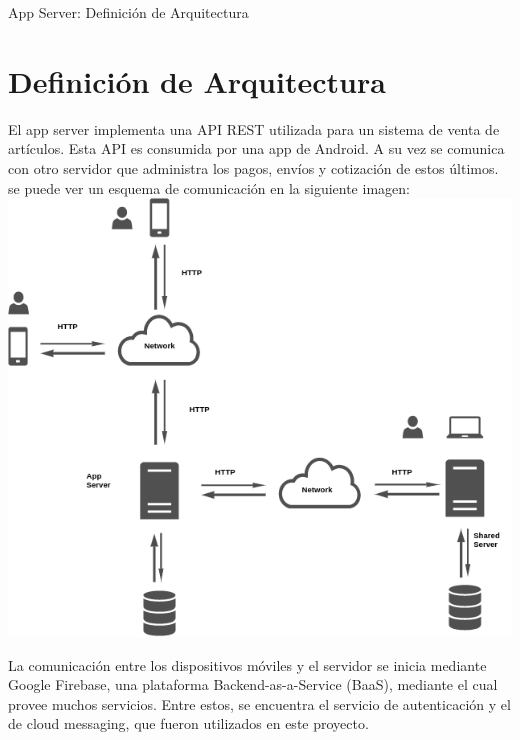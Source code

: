 \documentclass[a4paper, 12pt]{article}
\begin{document}
	\begin{titlepage}
		\vspace*{\fill}
		\begin{center}
			\Huge App Server: Definición de Arquitectura \\
			\bigskip\bigskip\bigskip
			
		\end{center}
		\vspace*{\fill}
	\end{titlepage}
	\newpage

	\tableofcontents
	\newpage

	\section{Definición de Arquitectura}
	El app server implementa una API REST utilizada para un sistema de venta de artículos. Esta API es consumida por una app de Android. A su vez se comunica con otro servidor que administra los pagos, envíos y cotización 
	de estos últimos. se puede ver un esquema de comunicación en la siguiente imagen: \\
	
	\includegraphics[width=\linewidth]{diagrama.png}
	
	La comunicación entre los dispositivos móviles y el servidor se inicia mediante Google Firebase, una plataforma Backend-as-a-Service (BaaS), mediante el cual provee muchos servicios. Entre estos, se encuentra el servicio de
	 autenticación y el de cloud messaging, que fueron utilizados en este proyecto.
	 
\end{document}
